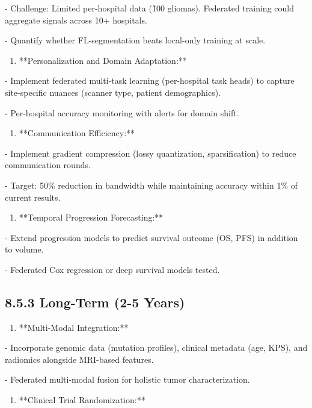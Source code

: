 - Challenge: Limited per-hospital data (\~100 gliomas). Federated training could aggregate signals across 10+ hospitals.

- Quantify whether FL-segmentation beats local-only training at scale.

\begin{enumerate}
  \item **Personalization and Domain Adaptation:**
\end{enumerate}

- Implement federated multi-task learning (per-hospital task heads) to capture site-specific nuances (scanner type, patient demographics).

- Per-hospital accuracy monitoring with alerts for domain shift.

\begin{enumerate}
  \item **Communication Efficiency:**
\end{enumerate}

- Implement gradient compression (lossy quantization, sparsification) to reduce communication rounds.

- Target: 50\% reduction in bandwidth while maintaining accuracy within 1\% of current results.

\begin{enumerate}
  \item **Temporal Progression Forecasting:**
\end{enumerate}

- Extend progression models to predict survival outcome (OS, PFS) in addition to volume.

- Federated Cox regression or deep survival models tested.


\subsection{8.5.3 Long-Term (2-5 Years)}
\begin{enumerate}
  \item **Multi-Modal Integration:**
\end{enumerate}

- Incorporate genomic data (mutation profiles), clinical metadata (age, KPS), and radiomics alongside MRI-based features.

- Federated multi-modal fusion for holistic tumor characterization.

\begin{enumerate}
  \item **Clinical Trial Randomization:**
\end{enumerate}

